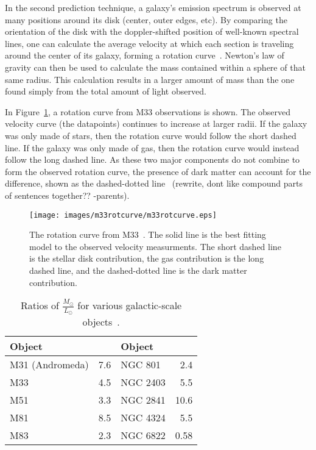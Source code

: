 In the second prediction technique, a galaxy's emission spectrum is observed at many positions around its disk (center, outer edges, etc).
By comparing the orientation of the disk with the doppler-shifted position of well-known spectral lines, one can calculate the average velocity at which each section is traveling around the center of its galaxy, forming a rotation curve~\cite{rotation_curve_review, spiral_galaxy_rot_curve, milkyway_dm_evidence}.
Newton's law of gravity can then be used to calculate the mass contained within a sphere of that same radius.
This calculation results in a larger amount of mass than the one found simply from the total amount of light observed.

In Figure~\ref{fig:m33rotcurve}, a rotation curve from M33 observations is shown.
The observed velocity curve (the datapoints) continues to increase at larger radii.
If the galaxy was only made of stars, then the rotation curve would follow the short dashed line.
If the galaxy was only made of gas, then the rotation curve would instead follow the long dashed line.
{\color{red}As these two major components do not combine to form the observed rotation curve, the presence of dark matter can account for the difference, shown as the dashed-dotted line~\cite{m33rotcurve} (rewrite, dont like compound parts of sentences together?? -parents)}.
    
\begin{figure}[!t]
  \centering
  \texttt{[image: images/m33rotcurve/m33rotcurve.eps]}
  \caption[M33 Rotation Curve]{
    The rotation curve from M33~\cite{m33rotcurve}.
    The solid line is the best fitting model to the observed velocity measurments.
    The short dashed line is the stellar disk contribution, the gas contribution is the long dashed line, and the dashed-dotted line is the dark matter contribution.
  }
  \label{fig:m33rotcurve}
\end{figure}

\begin{table}[h]
  \centering
  \caption[Ratios of $\frac{\textrm{M}_\odot}{\textrm{L}_\odot}$ for Various Galactic-scale Objects]{Ratios of $\frac{M_\odot}{L_\odot}$ for various galactic-scale objects~\cite{faber_ml}.}
  \label{tab:mlratios}
  \begin{tabular}{l r | l r}
    Object      &  \mlratio{} & Object & \mlratio{} \\
    \hline
    M31 (Andromeda) &  7.6  & NGC 801  &  2.4  \\
    M33             &  4.5  & NGC 2403 &  5.5  \\
    M51             &  3.3  & NGC 2841 & 10.6  \\
    M81             &  8.5  & NGC 4324 &  5.5  \\
    M83             &  2.3  & NGC 6822 &  0.58 \\
  \end{tabular}
\end{table}
      
